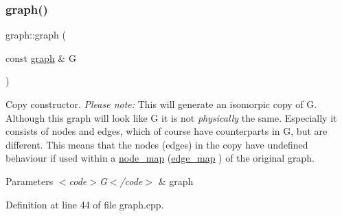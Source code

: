 \subsubsection{\texorpdfstring{graph()}{graph()}\hspace{0.1cm}{\footnotesize\ttfamily [2/4]}}
{\footnotesize\ttfamily graph\+::graph (\begin{DoxyParamCaption}\item[{const \mbox{\hyperlink{classgraph}{graph}} \&}]{G }\end{DoxyParamCaption})}

Copy constructor. {\itshape Please note\+:} This will generate an isomorpic copy of {\ttfamily G}. Although this graph will look like {\ttfamily G} it is not {\itshape physically} the same. Especially it consists of nodes and edges, which of course have counterparts in {\ttfamily G}, but are different. This means that the nodes (edges) in the copy have undefined behaviour if used within a \mbox{\hyperlink{classnode__map}{node\+\_\+map}} (\mbox{\hyperlink{classedge__map}{edge\+\_\+map}} ) of the original graph.


\begin{DoxyParams}{Parameters}
{\em $<$code$>$\+G$<$/code$>$} & graph \\
\hline
\end{DoxyParams}


Definition at line 44 of file graph.\+cpp.


